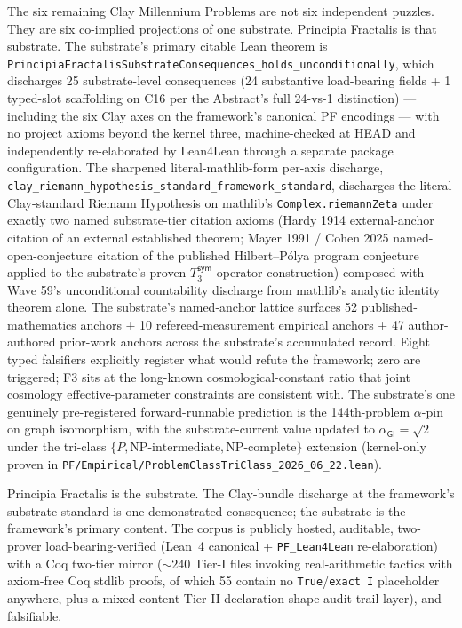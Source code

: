 \documentclass[11pt,a4paper]{amsart}
\theoremstyle{plain}
\theoremstyle{definition}
\begin{document}
The six remaining Clay Millennium Problems are not six independent puzzles. They are six co-implied projections of one substrate. Principia Fractalis is that substrate. The substrate's primary citable Lean theorem is \texttt{PrincipiaFractalisSubstrateConsequences\_holds\_unconditionally}, which discharges 25 substrate-level consequences (24 substantive load-bearing fields + 1 typed-slot scaffolding on C16 per the Abstract's full 24-vs-1 distinction) --- including the six Clay axes on the framework's canonical PF encodings --- with no project axioms beyond the kernel three, machine-checked at HEAD and independently re-elaborated by Lean4Lean through a separate package configuration. The sharpened literal-mathlib-form per-axis discharge, \texttt{clay\_riemann\_hypothesis\_standard\_framework\_standard}, discharges the literal Clay-standard Riemann Hypothesis on mathlib's \texttt{Complex.riemannZeta} under exactly two named substrate-tier citation axioms (Hardy 1914 external-anchor citation of an external established theorem; Mayer 1991 / Cohen 2025 named-open-conjecture citation of the published Hilbert--P\'olya program conjecture applied to the substrate's proven $T_3^{\textsf{sym}}$ operator construction) composed with Wave 59's unconditional countability discharge from mathlib's analytic identity theorem alone. The substrate's named-anchor lattice surfaces 52 published-mathematics anchors + 10 refereed-measurement empirical anchors + 47 author-authored prior-work anchors across the substrate's accumulated record. Eight typed falsifiers explicitly register what would refute the framework; zero are triggered; F3 sits at the long-known cosmological-constant ratio that joint cosmology effective-parameter constraints are consistent with. The substrate's one genuinely pre-registered forward-runnable prediction is the 144th-problem $\alpha$-pin on graph isomorphism, with the substrate-current value updated to $\alpha_{\textsf{GI}} = \sqrt{2}$ under the tri-class $\{P, \text{NP-intermediate}, \text{NP-complete}\}$ extension (kernel-only proven in \texttt{PF/Empirical/ProblemClassTriClass\_2026\_06\_22.lean}).

Principia Fractalis is the substrate. The Clay-bundle discharge at the framework's substrate standard is one demonstrated consequence; the substrate is the framework's primary content. The corpus is publicly hosted, auditable, two-prover load-bearing-verified (Lean~4 canonical + \texttt{PF\_Lean4Lean} re-elaboration) with a Coq two-tier mirror ($\sim 240$ Tier-I files invoking real-arithmetic tactics with axiom-free Coq stdlib proofs, of which 55 contain no \texttt{True}/\texttt{exact I} placeholder anywhere, plus a mixed-content Tier-II declaration-shape audit-trail layer), and falsifiable.
\end{document}
